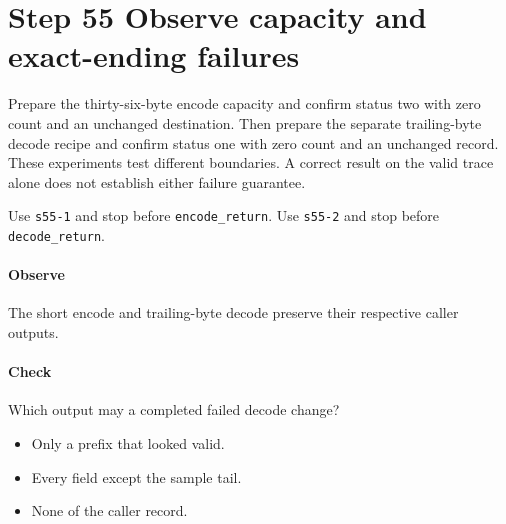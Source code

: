 \section{Step 55 Observe capacity and exact-ending failures}\label{cbor-s55}
Prepare the thirty-six-byte encode capacity and confirm status two with zero count and an unchanged destination. Then prepare the separate trailing-byte decode recipe and confirm status one with zero count and an unchanged record. These experiments test different boundaries. A correct result on the valid trace alone does not establish either failure guarantee.

Use \texttt{s55-1} and stop before \texttt{encode\_return}. Use \texttt{s55-2} and stop before \texttt{decode\_return}.

\paragraph{Observe} The short encode and trailing-byte decode preserve their respective caller outputs.

\paragraph{Check} Which output may a completed failed decode change?
\begin{itemize}
  \item[A.] Only a prefix that looked valid.
  \item[B.] Every field except the sample tail.
  \item[C.] None of the caller record.
\end{itemize}
